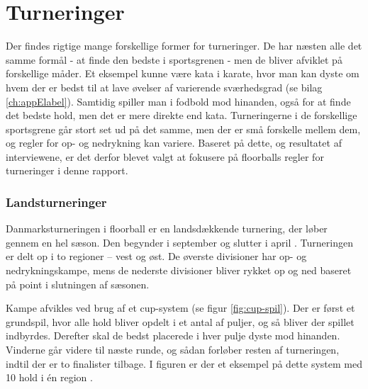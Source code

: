 \section{Turneringer}
Der findes rigtige mange forskellige former for turneringer. De har næsten alle det samme formål - at finde den bedste i sportsgrenen - men de bliver afviklet på forskellige måder. Et eksempel kunne være kata i karate, hvor man kan dyste om hvem der er bedst til at lave øvelser af varierende sværhedsgrad (se bilag \ref{ch:appElabel}). Samtidig spiller man i fodbold mod hinanden, også for at finde det bedste hold, men det er mere direkte end kata. Turneringerne i de forskellige sportsgrene går stort set ud på det samme, men der er små forskelle mellem dem, og regler for op- og nedrykning kan variere. Baseret på dette, og resultatet af interviewene, er det derfor blevet valgt at fokusere på floorballs regler for turneringer i denne rapport.

\subsubsection{Landsturneringer}
Danmarksturneringen i floorball er en landsdækkende turnering, der løber gennem en hel sæson. Den begynder i september og slutter i april \cite{Landsturnering}. Turneringen er delt op i to regioner – vest og øst. De øverste divisioner har op- og nedrykningskampe, mens de nederste divisioner bliver rykket op og ned baseret på point i slutningen af sæsonen.
\par
Kampe afvikles ved brug af et cup-system (se figur \ref{fig:cup-spil}). Der er først et grundspil, hvor alle hold bliver opdelt i et antal af puljer, og så bliver der spillet indbyrdes. Derefter skal de bedst placerede i hver pulje dyste mod hinanden. Vinderne går videre til næste runde, og sådan forløber resten af turneringen, indtil der er to finalister tilbage. I figuren er der et eksempel på dette system med 10 hold i én region \cite{Unihoc}\cite{Landsturnering}.

